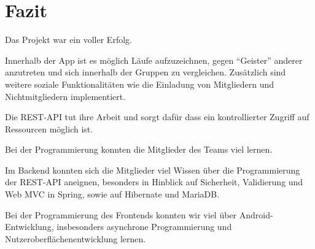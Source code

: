 \section{Fazit}\label{fazit}
Das Projekt war ein voller Erfolg.

Innerhalb der App ist es möglich Läufe aufzuzeichnen, gegen ``Geister'' anderer anzutreten und sich innerhalb der Gruppen zu vergleichen. Zusätzlich sind weitere soziale Funktionalitäten wie die Einladung von Mitgliedern und Nichtmitgliedern implementiert.

Die REST-API tut ihre Arbeit und sorgt dafür dass ein kontrollierter Zugriff auf Ressourcen möglich ist.

Bei der Programmierung konnten die Mitglieder des Teams viel lernen.

Im Backend konnten sich die Mitglieder viel Wissen über die Programmierung der REST-API aneignen, besonders in Hinblick auf Sicherheit, Validierung und Web MVC in Spring, sowie auf Hibernate und MariaDB. 

Bei der Programmierung des Frontends konnten wir viel über Android-Entwicklung, insbesonders asynchrone Programmierung und Nutzeroberflächenentwicklung lernen.